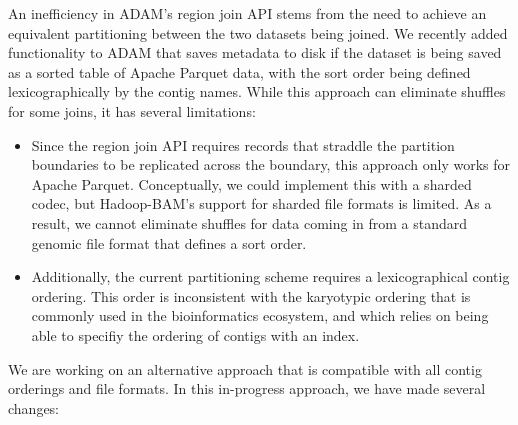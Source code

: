\documentclass[phd]{ucbthesis}
\begin{document}
An inefficiency in {ADAM}'s region join API stems from the need to
achieve an equivalent partitioning between the two datasets being joined. We
recently added functionality to {ADAM} that saves metadata to disk if the
dataset is being saved as a sorted table of {Apache Parquet} data, with
the sort order being defined lexicographically by the contig names. While this
approach can eliminate shuffles for some joins, it has several limitations:

\begin{itemize}
\item Since the region join API requires records that straddle the partition
  boundaries to be replicated across the boundary, this approach only works for
  {Apache Parquet}. Conceptually, we could implement this with a sharded
  codec, but {Hadoop-BAM}'s support for sharded file formats is limited.
  As a result, we cannot eliminate shuffles for data coming in from a standard
  genomic file format that defines a sort order.
\item Additionally, the current partitioning scheme requires a lexicographical
  contig ordering. This order is inconsistent with the karyotypic ordering that is
  commonly used in the bioinformatics ecosystem, and which relies on being
  able to specifiy the ordering of contigs with an index.
\end{itemize}

We are working on an alternative approach that is compatible with all contig
orderings and file formats. In this in-progress approach, we have made several
changes:
\end{document}
